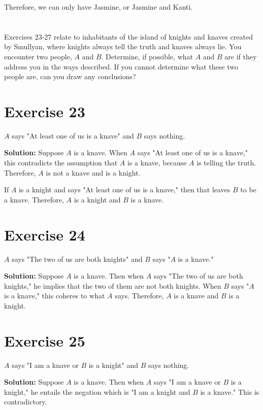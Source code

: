 \documentclass{Axon}
\begin{document}
Therefore, we can only have Jasmine, or Jasmine and Kanti.

\section*{}
Exercises 23-27 relate to inhabitants of the island of knights and knaves created by Smullyan, where knights always tell the truth and knaves always lie. You encounter two people, \(A\) and \(B\). Determine, if possible, what \(A\) and \(B\) are if they address you in the ways described. If you cannot determine what these two people are, can you draw any conclusions?

\section*{Exercise 23}
\(A\) says "At least one of us is a knave" and \(B\) says nothing.

\noindent
\textbf{Solution:}
Suppose \(A\) is a knave. When \(A\) says "At least one of us is a knave," this contradicts the assumption that \(A\) is a knave, because \(A\) is telling the truth. Therefore, \(A\) is not a knave and is a knight.

If \(A\) is a knight and says "At least one of us is a knave," then that leaves \(B\) to be a knave. Therefore, \(A\) is a knight and \(B\) is a knave.

\section*{Exercise 24}
\(A\) says "The two of us are both knights" and \(B\) says "\(A\) is a knave."

\noindent
\textbf{Solution:}
Suppose \(A\) is a knave. Then when \(A\) says "The two of us are both knights," he implies that the two of them are not both knights. When \(B\) says "\(A\) is a knave," this coheres to what \(A\) says. Therefore, \(A\) is a knave and \(B\) is a knight.

\section*{Exercise 25}
\(A\) says "I am a knave or \(B\) is a knight" and \(B\) says nothing.

\noindent
\textbf{Solution:}
Suppose \(A\) is a knave. Then when \(A\) says "I am a knave or \(B\) is a knight," he entails the negation which is "I am a knight and \(B\) is a knave." This is contradictory.
\end{document}
